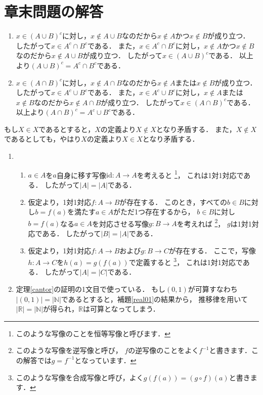 \documentclass[./main]{subfiles} %
\theoremstyle{definition}
\begin{document}
\section{章末問題の解答}
\begin{enumerate}
\item $x\in(A\cup B)^c$に対し，$x\notin A\cup B$なのだから$x\notin A$かつ$x\notin B$が成り立つ．
したがって$x\in A^c\cap B^c$である．
また，$x\in A^c\cap B^c$に対し，$x\notin A$かつ$x\notin B$なのだから$x\notin A\cup B$が成り立つ．
したがって$x\in(A\cup B)^c$である．
以上より$(A\cup B)^c=A^c\cap B^c$である．
\item $x\in(A\cap B)^c$に対し，$x\notin A\cap B$なのだから$x\notin A$または$x\notin B$が成り立つ．
したがって$x\in A^c\cup B^c$である．
また，$x\in A^c\cup B^c$に対し，$x\notin A$または$x\notin B$なのだから$x\notin A\cap B$が成り立つ．
したがって$x\in(A\cap B)^c$である．
以上より$(A\cap B)^c=A^c\cup B^c$である．
\end{enumerate}

もし$X\in X$であるとすると，$X$の定義より$X\notin X$となり矛盾する．
また，$X\notin X$であるとしても，やはり$X$の定義より$X\in X$となり矛盾する．

\begin{enumerate}
\item
\begin{enumerate}
\item $a\in A$を$a$自身に移す写像$\mathrm{id}\colon A\to A$を考えると
\footnote{このような写像のことを恒等写像と呼びます．}，
これは1対1対応である．
したがって$|A|=|A|$である．
\item 仮定より，1対1対応$f\colon A\to B$が存在する．
このとき，すべての$b\in B$に対し$b=f(a)$を満たす$a\in A$がただ1つ存在するから，
$b\in B$に対し$b=f(a)$なる$a\in A$を対応させる写像$g\colon B\to A$を考えれば
\footnote{このような写像を逆写像と呼び，
$f$の逆写像のことをよく$f^{-1}$と書きます．この解答では$g=f^{-1}$となっています．}，
$g$は1対1対応である．
したがって$|B|=|A|$である．
\item 仮定より，1対1対応$f\colon A\to B$および$g\colon B\to C$が存在する．
ここで，写像$h\colon A\to C$を$h(a)=g(f(a))$で定義すると
\footnote{このような写像を合成写像と呼び，よく$g(f(a))=(g\circ f)(a)$と書きます．}，
これは1対1対応である．
したがって$|A|=|C|$である．
\end{enumerate}
\item 定理\ref{cantor}の証明の1文目で使っている．
もし$(0,1)$が可算すなわち$|(0,1)|=|\mathbb{N}|$であるとすると，補題\ref{real01}の結果から，
推移律を用いて$|\mathbb{R}|=|\mathbb{N}|$が得られ，$\mathbb{R}$は可算となってしまう．
\end{enumerate}
\end{document}
